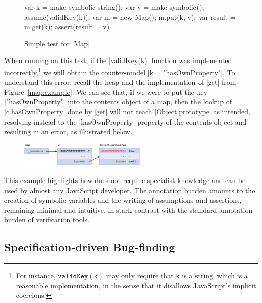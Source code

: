 \begin{figure}
\vspace*{-0.4cm}
\centering
\begin{lstjsex}
var k = make-symbolic-string();
var v = make-symbolic();
assume(validKey(k));
var m = new Map(); m.put(k, v); 
var result = m.get(k);
assert(result = v)
\end{lstjsex}
\vspace*{-0.35cm}
\caption{Simple test for \jsinline|Map|}
\label{test:map}
\vspace*{-0.35cm}
\end{figure}

% 
When running \cosette on this test, if the \jsinline|validKey(k)| function was implemented incorrectly,\footnote{For instance, $\mathtt{validKey(k)}$ may only require that $\mathtt{k}$ is a string, which is a reasonable implementation, in the sense that it disallows JavaScript's implicit coercions.}
we will obtain the counter-model \jsinline|k = "hasOwnProperty"|. To understand this error, recall the heap and the implementation of \jsinline|get| from Figure~\ref{map:example}. We can see that, if we were to put the key \jsinline|"hasOwnProperty"| into the contents object of a map, then the lookup of \jsinline|c.hasOwnProperty| done by \jsinline|get| will not reach \jsinline|Object.prototype| as intended, resolving instead to the \jsinline|hasOwnProperty| property of the contents object and resulting in an error, as illustrated below.

\begin{figure}
\vspace*{-0.4cm}
\centering
\includegraphics[width=0.54\textwidth]{figures/heapfail.png}
\vspace{-0.5cm}
\end{figure}

This example highlights how \cosette does not require specialist knowledge and can 
be used by almost any JavaScript developer. The annotation burden amounts to the creation of 
symbolic variables and the writing of assumptions and assertions, remaining minimal and intuitive, in stark contrast with the standard annotation burden of verification tools.

\subsection{Specification-driven Bug-finding}
\label{subsec:sdbf}

